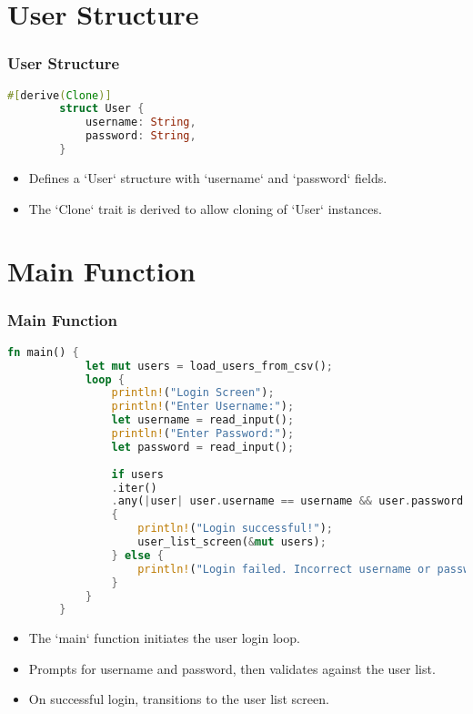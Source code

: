 \documentclass[aspectratio=169, table]{beamer}
\begin{document}
\section{User Structure}
\begin{frame}[fragile]
	\frametitle{User Structure}
	\begin{lstlisting}[language=Rust]
		#[derive(Clone)]
		struct User {
			username: String,
			password: String,
		}
	\end{lstlisting}
	\begin{itemize}
		\item Defines a `User` structure with `username` and `password` fields.
		\item The `Clone` trait is derived to allow cloning of `User` instances.
	\end{itemize}
\end{frame}

\section{Main Function}
\begin{frame}[fragile]
	\frametitle{Main Function}
	\begin{lstlisting}[language=Rust]
		fn main() {
			let mut users = load_users_from_csv();
			loop {
				println!("Login Screen");
				println!("Enter Username:");
				let username = read_input();
				println!("Enter Password:");
				let password = read_input();
				
				if users
				.iter()
				.any(|user| user.username == username && user.password == password)
				{
					println!("Login successful!");
					user_list_screen(&mut users);
				} else {
					println!("Login failed. Incorrect username or password.");
				}
			}
		}
	\end{lstlisting}
	\begin{itemize}
		\item The `main` function initiates the user login loop.
		\item Prompts for username and password, then validates against the user list.
		\item On successful login, transitions to the user list screen.
	\end{itemize}
\end{frame}
\end{document}
